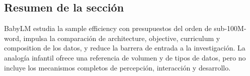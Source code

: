 \subsection{Resumen de la sección}

BabyLM estudia la sample efficiency con presupuestos del orden de sub-100M-word, impulsa la comparación de architecture, objective, curriculum y composition de los datos, y reduce la barrera de entrada a la investigación. La analogía infantil ofrece una referencia de volumen y de tipos de datos, pero no incluye los mecanismos completos de percepción, interacción y desarrollo.
